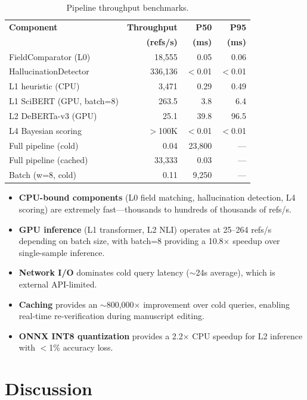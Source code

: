\documentclass[sigconf,nonacm]{acmart}
\begin{document}
\begin{table}[t]
\caption{Pipeline throughput benchmarks.}
\label{tab:throughput}
\centering
\small
\begin{tabular}{lrrr}
\toprule
\textbf{Component} & \textbf{Throughput} & \textbf{P50} & \textbf{P95} \\
 & \textbf{(refs/s)} & \textbf{(ms)} & \textbf{(ms)} \\
\midrule
FieldComparator (L0)     & 18,555 & 0.05 & 0.06 \\
HallucinationDetector    & 336,136 & $<$0.01 & $<$0.01 \\
L1 heuristic (CPU)       & 3,471 & 0.29 & 0.49 \\
L1 SciBERT (GPU, batch=8) & 263.5 & 3.8 & 6.4 \\
L2 DeBERTa-v3 (GPU)     & 25.1 & 39.8 & 96.5 \\
L4 Bayesian scoring      & $>$100K & $<$0.01 & $<$0.01 \\
\midrule
Full pipeline (cold)     & 0.04 & 23,800 & --- \\
Full pipeline (cached)   & 33,333 & 0.03 & --- \\
Batch (w=8, cold)        & 0.11 & 9,250 & --- \\
\bottomrule
\end{tabular}
\end{table}

\begin{itemize}[leftmargin=*]
    \item \textbf{CPU-bound components} (L0 field matching, hallucination detection, L4 scoring) are extremely fast---thousands to hundreds of thousands of refs/s.
    \item \textbf{GPU inference} (L1 transformer, L2 NLI) operates at 25--264 refs/s depending on batch size, with batch=8 providing a 10.8$\times$ speedup over single-sample inference.
    \item \textbf{Network I/O} dominates cold query latency ($\sim$24s average), which is external API-limited.
    \item \textbf{Caching} provides an $\sim$800,000$\times$ improvement over cold queries, enabling real-time re-verification during manuscript editing.
    \item \textbf{ONNX INT8 quantization} provides a 2.2$\times$ CPU speedup for L2 inference with $<$1\% accuracy loss.
\end{itemize}

\section{Discussion}
\label{sec:discussion}
\end{document}
